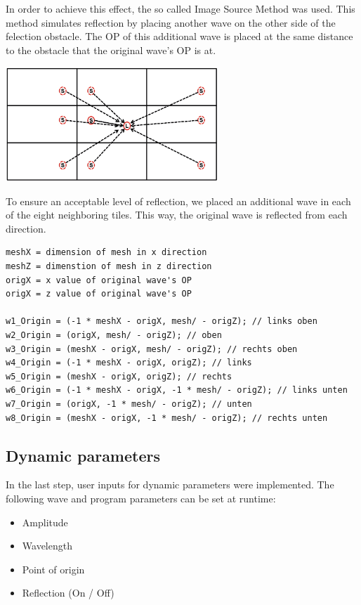 \documentclass[12pt,a4paper]{scrartcl}
\begin{document}
In order to achieve this effect, the so called Image Source Method was used. This method simulates reflection by placing another wave on the other side of the felection obstacle. The OP of this additional wave is placed at the same distance to the obstacle that the original wave's OP is at.

\begin{center}
	\includegraphics[width=0.6\textwidth]{Images/ImageSourceMethod.jpg}
\end{center}

To ensure an acceptable level of reflection, we placed an additional wave in each of the eight neighboring tiles. This way, the original wave is reflected from each direction.

\begin{lstlisting}[language=PSEUDO]
meshX = dimension of mesh in x direction
meshZ = dimenstion of mesh in z direction
origX = x value of original wave's OP
origX = z value of original wave's OP

w1_Origin = (-1 * meshX - origX, mesh/ - origZ); // links oben
w2_Origin = (origX, mesh/ - origZ); // oben
w3_Origin = (meshX - origX, mesh/ - origZ); // rechts oben
w4_Origin = (-1 * meshX - origX, origZ); // links
w5_Origin = (meshX - origX, origZ); // rechts
w6_Origin = (-1 * meshX - origX, -1 * mesh/ - origZ); // links unten
w7_Origin = (origX, -1 * mesh/ - origZ); // unten
w8_Origin = (meshX - origX, -1 * mesh/ - origZ); // rechts unten
\end{lstlisting}

\subsection{Dynamic parameters}
In the last step, user inputs for dynamic parameters were implemented. The following wave and program parameters can be set at runtime:
\begin{itemize}
	\item Amplitude
	\item Wavelength
	\item Point of origin
	\item Reflection (On / Off)
\end{itemize}
\end{document}
